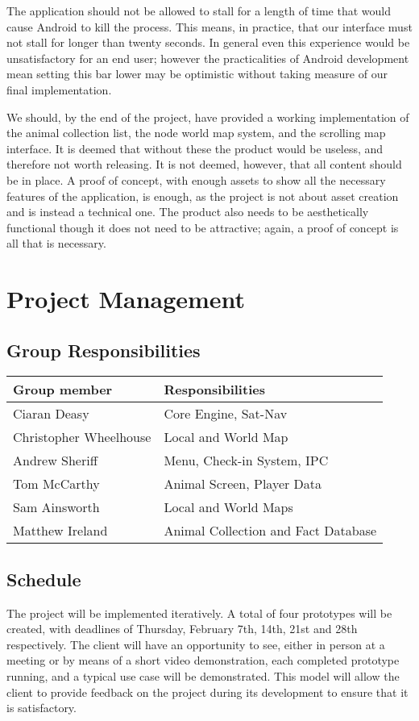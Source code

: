 \documentclass[12pt,a4paper,twoside]{article}
\begin{document}
The application should not be allowed to stall for a length of time that would cause Android to kill the process.
This means, in practice, that our interface must not stall for longer than twenty seconds.
In general even this experience would be unsatisfactory for an end user; however the practicalities of Android development mean setting this bar lower may be optimistic without taking measure of our final implementation.

We should, by the end of the project, have provided a working implementation of the animal collection list, the node world map system, and the scrolling map interface.
It is deemed that without these the product would be useless, and therefore not worth releasing.
It is not deemed, however, that all content should be in place.
A proof of concept, with enough assets to show all the necessary features of the application, is enough, as the project is not about asset creation and is instead a technical one.
The product also needs to be aesthetically functional though it does not need to be attractive; again, a proof of concept is all that is necessary.

\section{Project Management}

\subsection{Group Responsibilities}

\begin{tabular}{|l|l|}
\hline
\textbf{Group member} & \textbf{Responsibilities}\\
\hline
Ciaran Deasy & Core Engine, Sat-Nav\\
\hline
Christopher Wheelhouse & Local and World Map\\
\hline
Andrew Sheriff & Menu, Check-in System, IPC\\
\hline
Tom McCarthy & Animal Screen, Player Data\\
\hline
Sam Ainsworth & Local and World Maps\\
\hline
Matthew Ireland & Animal Collection and Fact Database\\
\hline
\end{tabular}

\subsection{Schedule}
The project will be implemented iteratively.
A total of four prototypes will be created, with deadlines of Thursday, February 7th, 14th, 21st and 28th respectively.
The client will have an opportunity to see, either in person at a meeting or by means of a short video demonstration, each completed prototype running, and a typical use case will be demonstrated.
This model will allow the client to provide feedback on the project during its development to ensure that it is satisfactory.
\end{document}
